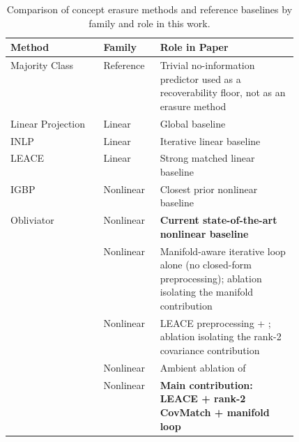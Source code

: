 \begin{table}[t]
\centering
\caption{Comparison of concept erasure methods and reference baselines by family and role in this work.}
\label{tab:method_comparison_scope}
\scriptsize
\begin{tabular}{llp{0.48\linewidth}}
\toprule
Method & Family & Role in Paper \\
\midrule
Majority Class & Reference & Trivial no-information predictor used as a recoverability floor, not as an erasure method \\
Linear Projection & Linear & Global baseline \\
INLP & Linear & Iterative linear baseline \\
LEACE & Linear & Strong matched linear baseline \\
IGBP & Nonlinear & Closest prior nonlinear baseline \\
Obliviator & Nonlinear & \textbf{Current state-of-the-art nonlinear baseline} \citep{akbari-etal-2025-obliviator} \\
\TanGCE{} & Nonlinear & Manifold-aware iterative loop alone (no closed-form preprocessing); ablation isolating the manifold contribution \\
\TanGCEp{} & Nonlinear & LEACE preprocessing + \TanGCE{}; ablation isolating the rank-2 covariance contribution \\
\AmbGCEpp{} & Nonlinear & Ambient ablation of \TanGCEpp{} \\
\TanGCEpp{} & Nonlinear & \textbf{Main contribution: LEACE + rank-2 CovMatch + manifold loop} \\
\bottomrule
\end{tabular}
\end{table}
